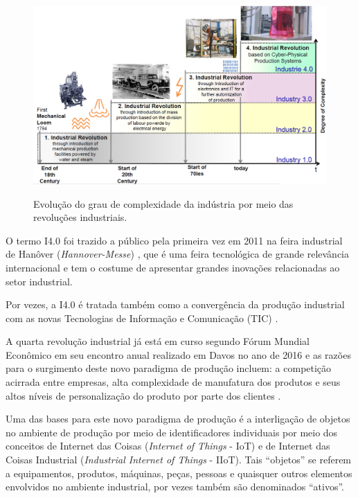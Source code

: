 \documentclass[
	12pt,				%
	oneside,			%
	a4paper,			%
	english,			%
	brazil				%
]{abntex2}
\begin{document}
	\begin{figure}[H]
		\centering
		\caption{Evolução do grau de complexidade da indústria por meio das revoluções industriais.}
		\includegraphics[width=1\textwidth]{i4-2.png}
		\label{fig:i4-2}
	\end{figure}

	O termo I4.0 foi trazido a público pela primeira vez em 2011 na feira industrial de Hanôver (\textit{Hannover-Messe}) \cite{kagermann2011industrie}, que é uma feira tecnológica de grande relevância internacional e tem o costume de apresentar grandes inovações relacionadas ao setor industrial.

	Por vezes, a I4.0 é tratada também como a convergência da produção industrial com as novas Tecnologias de Informação e Comunicação (TIC) \cite{hermann2016design}.

	A quarta revolução industrial já está em curso segundo Fórum Mundial Econômico \cite{schwab2016fourth} em seu encontro anual realizado em Davos no ano de 2016 e as razões para o surgimento deste novo paradigma de produção incluem: a competição acirrada entre empresas, alta complexidade de manufatura dos produtos e seus altos níveis de personalização do produto por parte dos clientes \cite{bordeleau2018bi, vaidya2018industryfour}.

	Uma das bases para este novo paradigma de produção é a interligação de objetos no ambiente de produção por meio de identificadores individuais por meio dos conceitos de Internet das Coisas (\textit{Internet of Things} - IoT) e de Internet das Coisas Industrial (\textit{Industrial Internet of Things} - IIoT). Tais ``objetos'' se referem a equipamentos, produtos, máquinas, peças, pessoas e quaisquer outros elementos envolvidos no ambiente industrial, por vezes também são denominados ``ativos''.
	
\end{document}
